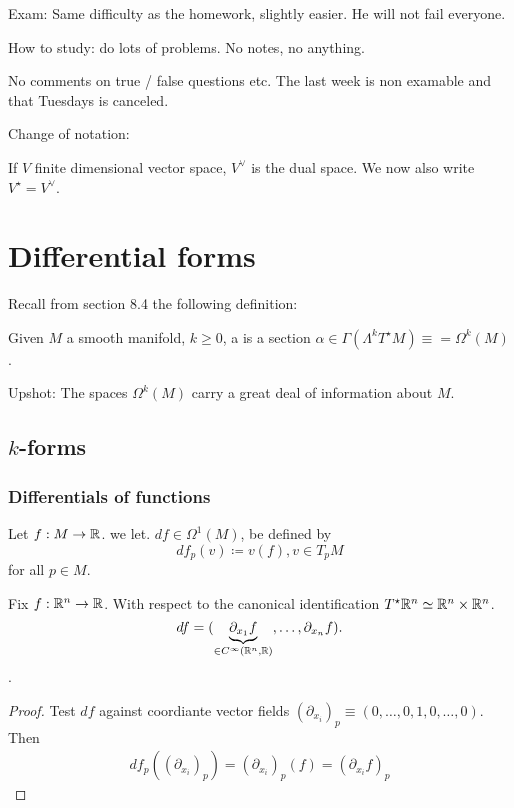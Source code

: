 
Exam:  Same difficulty as the homework, slightly easier. He will not fail everyone.

How to study: do lots of problems. No notes, no anything.

No comments on true / false questions etc. The last week is non examable and that Tuesdays is canceled.

Change of notation: 

If \(V\) finite dimensional vector space, \(V^\vee\) is the dual space. We now also write 
\(V^\star=V^\vee\).

\chapter{Differential forms}

Recall from section 8.4 the following definition:

\begin{definition*}
    Given \(M\) a smooth manifold, \(k\geq 0\), a  is a section 
    \(\alpha\in \Gamma(\Lambda^kT^\star M)\equiv=\Omega^k(M)\).
\end{definition*}

Upshot: The spaces \(\Omega^k(M)\) carry a great deal of information about \(M\).

\section{\(k\)-forms}

\subsection{Differentials of functions}

\begin{definition*}
    Let \(f:M\to \mathbb{R}\). we let. \(df\in\Omega^1(M)\),
    be defined by \[df_p(v)\coloneqq v(f),v\in T_pM\]
    for all \(p\in M\). 
\end{definition*}

\begin{lemma}\label{lem:10.1}
    Fix \(f:\mathbb{R}^n\to \mathbb{R}\). With respect to the canonical identification
    \(T^\star\mathbb{R}^n\simeq \mathbb{R}^n\times \mathbb{R}^n\).
    \[df=(\underbrace{\partial_{x_1} f}_{\in C^\infty(\mathbb{R}^n,\mathbb{R})},\dots, \partial_{x_n}f).\] .
\end{lemma}

\begin{proof}
    Test \(df\) against coordiante vector fields \((\partial_{x_i})_p\equiv (0,\dots,0,1,0,\dots,0)\).
    Then \begin{align}
        df_p((\partial_{x_i})_p)=(\partial_{x_i})_p (f)=(\partial_{x_i}f)_p
    \end{align}
\end{proof}

